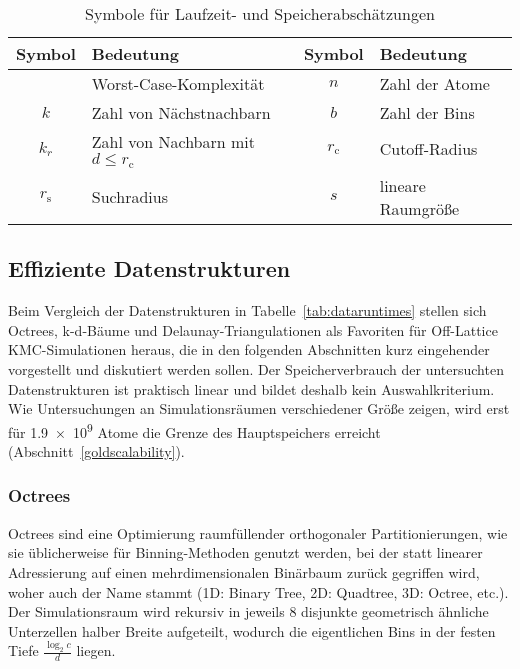 \begin{table}[!ht]
  \vspace{1em}

  \oddrowcolors
  \caption{Symbole für Laufzeit- und Speicherabschätzungen}
  \label{tab:datasymbols}
  \begin{tabularx}{\textwidth}{|cX|cX|}
    \hline
    \textbf{Symbol} & \textbf{Bedeutung}                        & \textbf{Symbol} & \textbf{Bedeutung} \\
    \hline
    \BigO{}         & Worst-Case-Komplexität                    & $n$             & Zahl der Atome     \\
    $k$             & Zahl von Nächstnachbarn                   & $b$             & Zahl der Bins      \\
    $k_r$           & Zahl von Nachbarn mit $d \leq r_\text{c}$ & $r_\text{c}$    & Cutoff-Radius      \\
    $r_\text{s}$    & Suchradius                                & $s$             & lineare Raumgröße  \\
    \hline
  \end{tabularx}

\end{table}

\subsection{Effiziente Datenstrukturen}

Beim Vergleich der Datenstrukturen in Tabelle~\ref{tab:dataruntimes} stellen sich Octrees, k-d-Bäume und Delaunay-Triangulationen als Favoriten für Off-Lattice KMC-Simulationen heraus, die in den folgenden Abschnitten kurz eingehender vorgestellt und diskutiert werden sollen.
Der Speicherverbrauch der untersuchten Datenstrukturen ist praktisch linear und bildet deshalb kein Auswahlkriterium.
Wie Untersuchungen an Simulationsräumen verschiedener Größe zeigen, wird erst für \num{1.9e9} Atome die Grenze des Hauptspeichers erreicht (Abschnitt~\ref{goldscalability}).

\subsubsection{Octrees}
\label{dataoctree}

Octrees sind eine Optimierung raumfüllender orthogonaler Partitionierungen, wie sie üblicherweise für Binning-Methoden genutzt werden, bei der statt linearer Adressierung auf einen mehrdimensionalen Binärbaum zurück gegriffen wird, woher auch der Name stammt (1D: Binary Tree, 2D: Quadtree, 3D: Octree, etc.).
Der Simulationsraum wird rekursiv in jeweils 8 disjunkte geometrisch ähnliche Unterzellen halber Breite aufgeteilt, wodurch die eigentlichen Bins in der festen Tiefe $\frac{\log_2{c}}{d}$ liegen.

